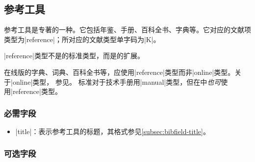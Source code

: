 
\subsection{参考工具}\label{subsec:bibtype-reference}

参考工具是专著的一种。它包括年鉴、手册、百科全书、字典等\cite{gbt3469-1983}。它对应的{\BibTeX}文献项
类型为|reference|；所对应的文献类型单字码为|K|\cite{gbt3469-1983}。

|reference|类型不是{\BibTeX}的标准类型，而是{\njuthesis}的扩展。

\begin{note}
在线版的字典、词典、百科全书等，应使用|reference|类型而非|online|类型。关于|online|类型，
参见\cite{subsec:bibtype-online}。
标准{\BibTeX}对于技术手册用|manual|类型，但在{\njuthesis}中\emph{也可}使
用|reference|类型。
\end{note}

\subsubsection{必需字段}

\begin{itemize}
\item |title|：表示参考工具的标题，其格式参见\ref{subsec:bibfield-title}。
\end{itemize}

\subsubsection{可选字段}

